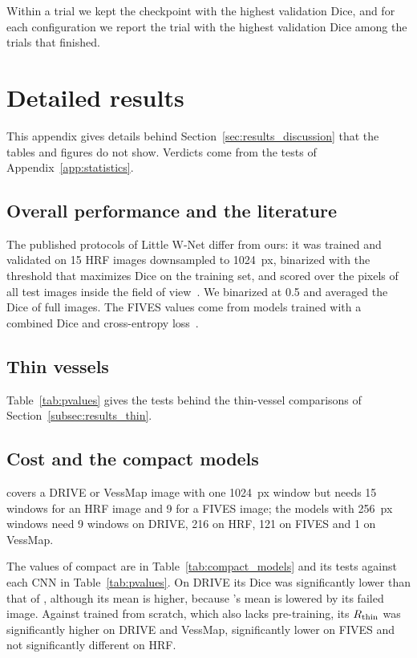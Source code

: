 Within a trial we kept the checkpoint with the highest validation Dice, and for each configuration we report the trial with the highest validation Dice among the trials that finished.





\section{Detailed results}
\label{app:results_detail}

This appendix gives details behind Section~\ref{sec:results_discussion} that the tables and figures do not show. Verdicts come from the tests of Appendix~\ref{app:statistics}.

\subsection{Overall performance and the literature}
The published protocols of Little W-Net differ from ours: it was trained and validated on 15 HRF images downsampled to 1024~px, binarized with the threshold that maximizes Dice on the training set, and scored over the pixels of all test images inside the field of view~\cite{galdran2020littlewnetcouldstateoftheart}. We binarized at 0.5 and averaged the Dice of full images. The FIVES values come from models trained with a combined Dice and cross-entropy loss~\cite{fadugba2024benchmarking}.

\subsection{Thin vessels}
Table~\ref{tab:pvalues} gives the tests behind the thin-vessel comparisons of Section~\ref{subsec:results_thin}.

\subsection{Cost and the compact models}
\medsam{} covers a DRIVE or VessMap image with one 1024~px window but needs 15 windows for an HRF image and 9 for a FIVES image; the models with 256~px windows need 9 windows on DRIVE, 216 on HRF, 121 on FIVES and 1 on VessMap.

The values of compact \medsam{} are in Table~\ref{tab:compact_models} and its tests against each CNN in Table~\ref{tab:pvalues}. On DRIVE its Dice was significantly lower than that of \convunext{}, although its mean is higher, because \convunext{}'s mean is lowered by its failed image. Against \medsam{} trained from scratch, which also lacks pre-training, its $R_{\mathrm{thin}}$ was significantly higher on DRIVE and VessMap, significantly lower on FIVES and not significantly different on HRF.

